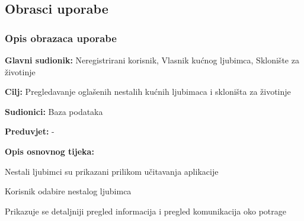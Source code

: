 			\eject 
			
			
				
			\subsection{Obrasci uporabe}
				
				\subsubsection{Opis obrazaca uporabe}		

					\noindent {}
					\begin{packed_item}
	
						\item \textbf{Glavni sudionik: }Neregistrirani korisnik, Vlasnik kućnog ljubimca, Sklonište za životinje
						\item  \textbf{Cilj:} Pregledavanje oglašenih nestalih kućnih ljubimaca i skloništa za životinje
						\item  \textbf{Sudionici:} Baza podataka
						\item  \textbf{Preduvjet:} -
						\item  \textbf{Opis osnovnog tijeka:}
						
						\item[] \begin{packed_enum}
	
							\item Nestali ljubimci su prikazani prilikom učitavanja aplikacije
							\item Korisnik odabire nestalog ljubimca
							\item Prikazuje se detaljniji pregled informacija i pregled komunikacija oko potrage
						\end{packed_enum}
						
					\end{packed_item}
				
